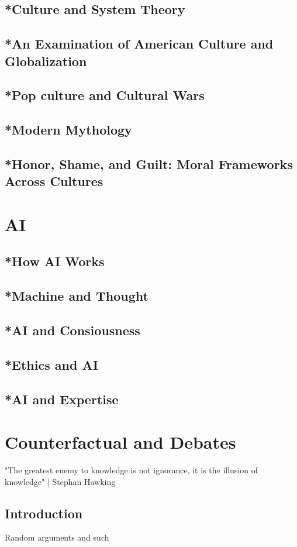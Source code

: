 \section{*Culture and System Theory}
\section{*An Examination of American Culture and Globalization}
\section{*Pop culture and Cultural Wars}
\section{*Modern Mythology}
\section{*Honor, Shame, and Guilt: Moral Frameworks Across Cultures}
\chapter{AI}
\section{*How AI Works}
\section{*Machine and Thought}
\section{*AI and Consiousness}
\section{*Ethics and AI}
\section{*AI and Expertise}
\chapter{Counterfactual and Debates}
"The greatest enemy to knowledge is not ignorance, it is the illusion of knowledge" | Stephan Hawking 
\section{Introduction}
\par Random arguments and such
